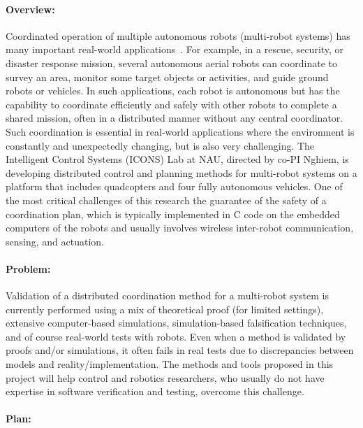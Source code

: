 
\paragraph{Overview:}

Coordinated operation of multiple autonomous robots (multi-robot systems) has many important real-world applications~\cite{multirobot2005,multirobotsurvey2013}.
For example, in a rescue, security, or disaster response mission, several autonomous aerial robots can coordinate to survey an area, monitor some target objects or activities, and guide ground robots or vehicles.
In such applications, each robot is autonomous but has the capability to coordinate efficiently and safely with other robots to complete a shared mission, often in a distributed manner without any central coordinator.
Such coordination is essential in real-world applications where the environment is constantly and unexpectedly changing, but is also very challenging.
The Intelligent Control Systems (ICONS) Lab at NAU, directed by co-PI Nghiem, is developing distributed control and planning methods for multi-robot systems on a platform that includes quadcopters and four fully autonomous vehicles.
One of the most critical challenges of this research the guarantee of the safety of a coordination plan, which is typically implemented in C code on the embedded computers of the robots and usually involves wireless inter-robot communication, sensing, and actuation.

\paragraph{Problem:}

Validation of a distributed coordination method for a multi-robot system is currently performed using a mix of theoretical proof (for limited settings), extensive computer-based simulations, simulation-based falsification techniques, and of course real-world tests with robots.
Even when a method is validated by proofs and/or simulations, it often fails in real tests due to discrepancies between models and reality/implementation.
The methods and tools proposed in this project will help control and robotics researchers, who usually do not have expertise in software verification and testing, overcome this challenge.


\paragraph{Plan:}


